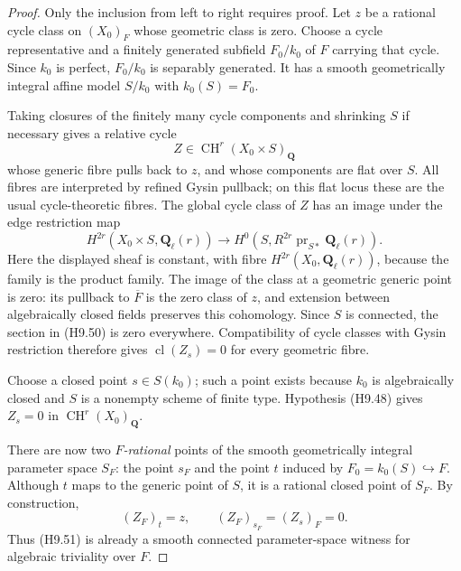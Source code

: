 \begin{proof}
Only the inclusion from left to right requires proof. Let $z$ be a
rational cycle class on $(X_0)_F$ whose geometric class is zero.
Choose a cycle representative and a finitely generated subfield
$F_0/k_0$ of $F$ carrying that cycle. Since $k_0$ is perfect,
$F_0/k_0$ is separably generated. It has a smooth geometrically
integral affine model $S/k_0$ with $k_0(S)=F_0$.

Taking closures of the finitely many cycle components and shrinking
$S$ if necessary gives a relative cycle
\[
 Z\in\operatorname{CH}^r(X_0\times S)_{\mathbf Q}
\]
whose generic fibre pulls back to $z$, and whose components are flat
over $S$. All fibres are interpreted by refined Gysin pullback; on
this flat locus these are the usual cycle-theoretic fibres. The
global cycle class of $Z$ has an image under the edge restriction map
\[
 H^{2r}(X_0\times S,\mathbf Q_\ell(r))
  \longrightarrow
 H^0\!\left(S,R^{2r}\operatorname{pr}_{S*}\mathbf Q_\ell(r)\right).
                                                               \tag{H9.50}
\]
Here the displayed sheaf is constant, with fibre
$H^{2r}(X_0,\mathbf Q_\ell(r))$, because the family is the product
family. The image of the class at a geometric generic point is zero:
its pullback to $\overline F$ is the zero class of $z$, and extension
between algebraically closed fields preserves this cohomology.
Since $S$ is connected, the section in (H9.50) is zero everywhere.
Compatibility of cycle classes with Gysin restriction therefore
gives $\operatorname{cl}(Z_s)=0$ for every geometric fibre.

Choose a closed point $s\in S(k_0)$; such a point exists because
$k_0$ is algebraically closed and $S$ is a nonempty scheme of finite
type. Hypothesis (H9.48) gives $Z_s=0$ in
$\operatorname{CH}^r(X_0)_{\mathbf Q}$.

There are now two \emph{$F$-rational} points of the smooth
geometrically integral parameter space $S_F$: the point $s_F$ and
the point $t$ induced by $F_0=k_0(S)\hookrightarrow F$. Although
$t$ maps to the generic point of $S$, it is a rational closed point
of $S_F$. By construction,
\[
 (Z_F)_t=z,\qquad (Z_F)_{s_F}=(Z_s)_F=0.
                                                               \tag{H9.51}
\]
Thus (H9.51) is already a smooth connected parameter-space witness
for algebraic triviality over $F$.


\end{proof}

